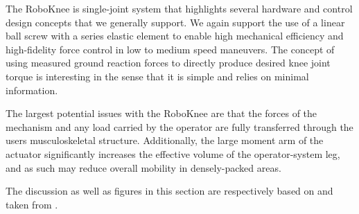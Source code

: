 \begin{refsection}
 The RoboKnee is single-joint system that highlights several hardware and control design concepts that we generally support.  We again support the use of a linear ball screw with a series elastic element to enable high mechanical efficiency and high-fidelity force control in low to medium speed maneuvers. The concept of using measured ground reaction forces to directly produce desired knee joint torque is interesting in the sense that it is simple and relies on minimal information.
 
The largest potential issues with the RoboKnee are that the forces of the mechanism and any load carried by the operator are fully transferred through the users musculoskeletal structure.  Additionally, the large moment arm of the actuator significantly increases the effective volume of the operator-system leg, and as such may reduce overall mobility in densely-packed areas.
 
 The discussion as well as figures in this section are respectively based on and taken from \cite{robo_knee_2004}.  
 
\printbibliography[heading=subbibliography]

\end{refsection}

 
 
 
 
 
